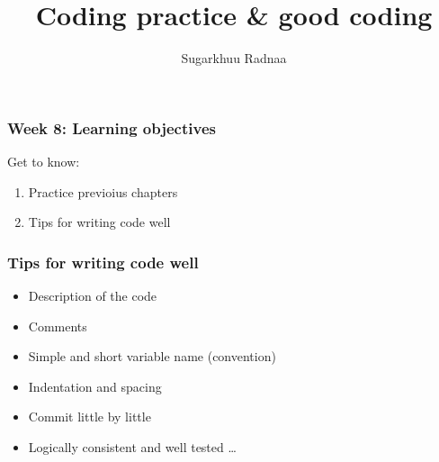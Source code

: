 \documentclass{beamer}
\title[Introduction to Python]{Coding practice \& good coding}
\author{Sugarkhuu Radnaa}
\institute[]
{
Py4Econ in Ulaanbaatar \\ 
\medskip
\textit{py4econ@gmail.com} 
}
\date{}  %
\begin{document}
\begin{frame}
\titlepage %
\end{frame}

\begin{frame}
    \frametitle{Week 8: Learning objectives}
    Get to know: 
    \begin{enumerate}
            \item Practice previoius chapters
            \item Tips for writing code well  
    \end{enumerate}
\end{frame}


\begin{frame}
    \frametitle{Tips for writing code well}
    \begin{itemize}
        \item Description of the code
        \item Comments
        \item Simple and short variable name (convention)
        \item Indentation and spacing
        \item Commit little by little
        \item Logically consistent and well tested … 

    \end{itemize}
\end{frame}




\end{document}
